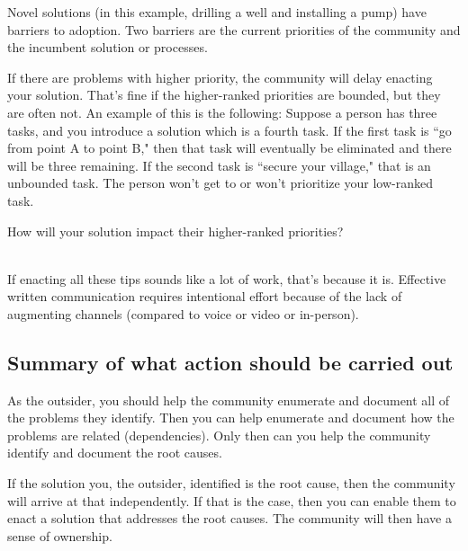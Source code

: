 Novel solutions (in this example, drilling a well and installing a pump) have barriers to adoption. Two barriers are the current priorities of the community and the incumbent solution or processes.

If there are problems with higher priority, the community will delay enacting your solution. That's fine if the higher-ranked priorities are bounded, but they are often not. An example of this is the following:
Suppose a person has three tasks, and you introduce a solution which is a fourth task.
If the first task is ``go from point A to point B," then that task will eventually be eliminated and there will be three remaining.
If the second task is ``secure your village," that is an unbounded task. The person won't get to or won't prioritize your low-ranked task.

How will your solution impact their higher-ranked priorities?

\ \\

If enacting all these tips sounds like a lot of work, that's because it is. Effective written communication requires intentional effort because of the lack of augmenting channels (compared to voice or video or in-person). 




\subsection*{Summary of what action should be carried out} 

As the outsider, you should help the community enumerate and document all of the problems they identify. Then you can help enumerate and document how the problems are related (dependencies). Only then can you help the community identify and document the root causes.

If the solution you, the outsider, identified is the root cause, then the community will arrive at that independently. If that is the case, then you can enable them to enact a solution that addresses the root causes. The community will then have a sense of ownership.
